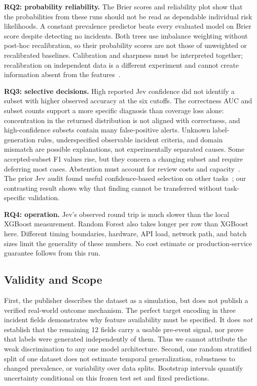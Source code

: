 \documentclass{llncs}
\begin{document}
\textbf{RQ2: probability reliability.} The Brier scores and reliability plot show that the probabilities from these runs should not be read as dependable individual risk likelihoods. A constant prevalence predictor beats every evaluated model on Brier score despite detecting no incidents. Both trees use imbalance weighting without post-hoc recalibration, so their probability scores are not those of unweighted or recalibrated baselines. Calibration and sharpness must be interpreted together; recalibration on independent data is a different experiment and cannot create information absent from the features~\cite{chidambaram2025reassessing,haotian2023recal}.

\textbf{RQ3: selective decisions.} High reported Jev confidence did not identify a subset with higher observed accuracy at the six cutoffs. The correctness AUC and subset counts support a more specific diagnosis than coverage loss alone: concentration in the returned distribution is not aligned with correctness, and high-confidence subsets contain many false-positive alerts. Unknown label-generation rules, underspecified observable incident criteria, and domain mismatch are possible explanations, not experimentally separated causes. Some accepted-subset F1 values rise, but they concern a changing subset and require deferring most cases. Abstention must account for review costs and capacity~\cite{singh2026abstention}. The prior Jev audit found useful confidence-based selection on other tasks~\cite{provatas2026systemone}; our contrasting result shows why that finding cannot be transferred without task-specific validation.

\textbf{RQ4: operation.} Jev's observed round trip is much slower than the local XGBoost measurement. Random Forest also takes longer per row than XGBoost here. Different timing boundaries, hardware, API load, network path, and batch sizes limit the generality of these numbers. No cost estimate or production-service guarantee follows from this run.

\subsection{Validity and Scope}

First, the publisher describes the dataset as a simulation, but does not publish a verified real-world outcome mechanism. The perfect target encoding in three incident fields demonstrates why feature availability must be specified. It does \emph{not} establish that the remaining 12 fields carry a usable pre-event signal, nor prove that labels were generated independently of them. Thus we cannot attribute the weak discrimination to any one model architecture. Second, one random stratified split of one dataset does not estimate temporal generalization, robustness to changed prevalence, or variability over data splits. Bootstrap intervals quantify uncertainty conditional on this frozen test set and fixed predictions.
\end{document}
